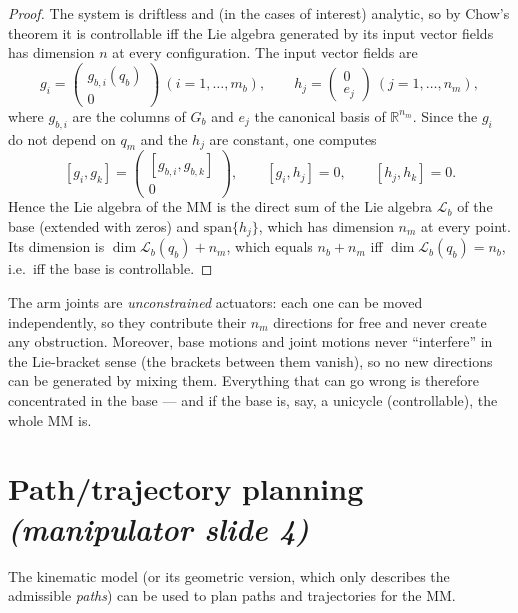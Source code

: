 \documentclass[11pt,a4paper]{article}
\def\bm#1{#1}%
\newcommand{\R}{\mathbb{R}}
\newcommand{\qbase}{\bm{q}_b}
\newcommand{\qarm}{\bm{q}_m}
\newcommand{\Gbase}{\bm{G}_b}
\theoremstyle{definition}
\theoremstyle{plain}
\theoremstyle{remark}
\begin{document}
\begin{proof}
The system is driftless and (in the cases of interest) analytic, so by Chow's theorem it is controllable iff the Lie algebra generated by its input vector fields has dimension $n$ at every configuration. The input vector fields are
\[
\bm g_i=\begin{pmatrix}\bm g_{b,i}(\qbase)\\ \bm 0\end{pmatrix}\ (i=1,\dots,m_b),\qquad
\bm h_j=\begin{pmatrix}\bm 0\\ \bm e_j\end{pmatrix}\ (j=1,\dots,n_m),
\]
where $\bm g_{b,i}$ are the columns of $\Gbase$ and $\bm e_j$ the canonical basis of $\R^{n_m}$. Since the $\bm g_i$ do not depend on $\qarm$ and the $\bm h_j$ are constant, one computes
\[
[\bm g_i,\bm g_k]=\begin{pmatrix}[\bm g_{b,i},\bm g_{b,k}]\\ \bm 0\end{pmatrix},\qquad
[\bm g_i,\bm h_j]=\bm 0,\qquad [\bm h_j,\bm h_k]=\bm 0 .
\]
Hence the Lie algebra of the MM is the direct sum of the Lie algebra $\mathcal L_b$ of the base (extended with zeros) and $\mathrm{span}\{\bm h_j\}$, which has dimension $n_m$ at every point. Its dimension is $\dim\mathcal L_b(\qbase)+n_m$, which equals $n_b+n_m$ iff $\dim\mathcal L_b(\qbase)=n_b$, i.e.\ iff the base is controllable.
\end{proof}

\begin{intuition}
The arm joints are \emph{unconstrained} actuators: each one can be moved independently, so they contribute their $n_m$ directions for free and never create any obstruction. Moreover, base motions and joint motions never ``interfere'' in the Lie-bracket sense (the brackets between them vanish), so no new directions can be generated by mixing them. Everything that can go wrong is therefore concentrated in the base --- and if the base is, say, a unicycle (controllable), the whole MM is.
\end{intuition}

\section{Path/trajectory planning \emph{(manipulator slide 4)}}

The kinematic model (or its geometric version, which only describes the admissible \emph{paths}) can be used to plan paths and trajectories for the MM.
\end{document}
